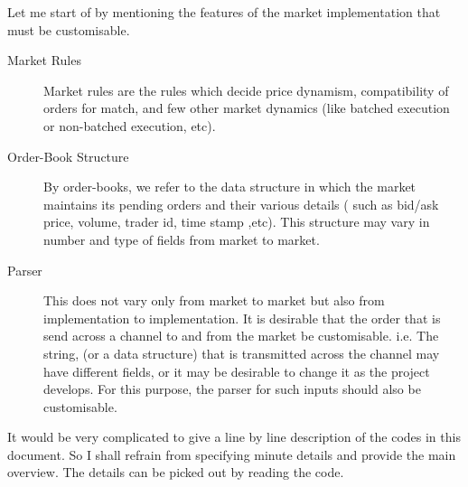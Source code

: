 \documentclass{amsart}
\begin{document}
Let me start of by mentioning the features of the market implementation that
must be customisable.
\begin{description}
  \item[Market Rules] Market rules are the rules which decide price dynamism,
  compatibility of orders for match, and few other market dynamics (like
  batched execution or non-batched execution, etc).
  
  \item[Order-Book Structure] By order-books, we refer to the data structure
  in which the market maintains its pending orders and their various details (
  such as bid/ask price, volume, trader id, time stamp ,etc). This structure
  may vary in number and type of fields from market to market.
  
  \item[Parser] This does not vary only from market to market but also from
  implementation to implementation. It is desirable that the order that is
  send across a channel to and from the market be customisable. i.e. The
  string, (or a data structure) that is transmitted across the channel may
  have different fields, or it may be desirable to change it as the project
  develops. For this purpose, the parser for such inputs should also be
  customisable.
\end{description}
It would be very complicated to give a line by line description of the codes
in this document. So I shall refrain from specifying minute details and
provide the main overview. The details can be picked out by reading the code.
\end{document}
